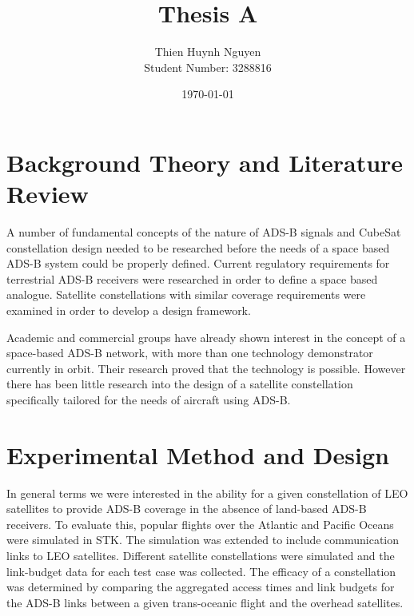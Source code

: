 \documentclass[12pt, a4paper, subeqn]{report}
\title{Thesis A}
\author{Thien Huynh Nguyen\\
	Student Number: 3288816}
\date{\today}
\numberwithin{figure}{chapter}
\numberwithin{table}{chapter}
\numberwithin{equation}{chapter}
\begin{document}
\doublespacing
{}



\tableofcontents
\newpage
\listoffigures
\newpage
\listoftables
\newpage


\fancyhead[L]{\slshape \leftmark}




\chapter{Background Theory and Literature Review} \label{part:lit_review}
A number of fundamental concepts of the nature of ADS-B signals and CubeSat constellation design needed to be researched before the needs of a space based ADS-B system could be properly defined. Current regulatory requirements for terrestrial ADS-B receivers were researched in order to define a space based analogue. Satellite constellations with similar coverage requirements were examined in order to develop a design framework.

Academic and commercial groups have already shown interest in the concept of a space-based ADS-B network, with more than one technology demonstrator currently in orbit. Their research proved that the technology is possible. However there has been little research into the design of a satellite constellation specifically tailored for the needs of aircraft using ADS-B.  
 



\newpage
\chapter{Experimental Method and Design}
\label{part:exp_method}
In general terms we were interested in the ability for a given constellation of LEO satellites to provide ADS-B coverage in the absence of land-based ADS-B receivers. To evaluate this, popular flights over the Atlantic and Pacific Oceans were simulated in STK. The simulation was extended to include communication links to LEO satellites. Different satellite constellations were simulated and the link-budget data for each test case was collected. The efficacy of a constellation was determined by comparing the aggregated access times and link budgets for the ADS-B links between a given trans-oceanic flight and the overhead satellites.




\end{document}
